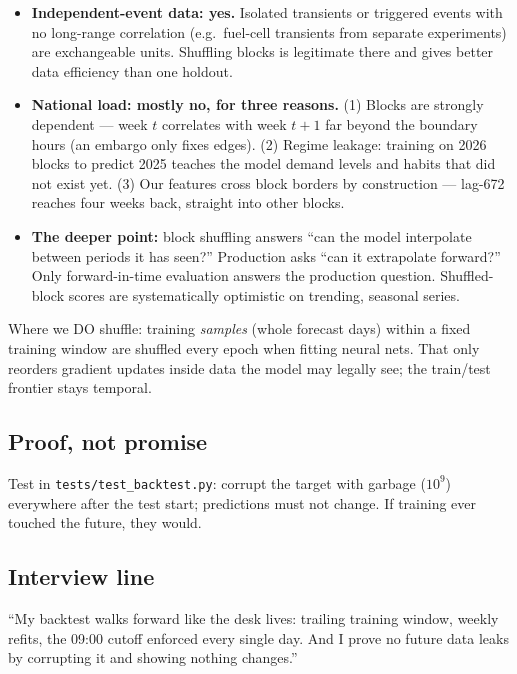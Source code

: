 \begin{itemize}
  \item \textbf{Independent-event data: yes.} Isolated transients or triggered
        events with no long-range correlation (e.g.\ fuel-cell transients from
        separate experiments) are exchangeable units. Shuffling blocks is
        legitimate there and gives better data efficiency than one holdout.
  \item \textbf{National load: mostly no, for three reasons.}
        (1) Blocks are strongly dependent --- week $t$ correlates with week
        $t{+}1$ far beyond the boundary hours (an embargo only fixes edges).
        (2) Regime leakage: training on 2026 blocks to predict 2025 teaches
        the model demand levels and habits that did not exist yet.
        (3) Our features cross block borders by construction --- lag-672
        reaches four weeks back, straight into other blocks.
  \item \textbf{The deeper point:} block shuffling answers ``can the model
        interpolate between periods it has seen?'' Production asks ``can it
        extrapolate forward?'' Only forward-in-time evaluation answers the
        production question. Shuffled-block scores are systematically
        optimistic on trending, seasonal series.
\end{itemize}

Where we DO shuffle: training \emph{samples} (whole forecast days) within a
fixed training window are shuffled every epoch when fitting neural nets.
That only reorders gradient updates inside data the model may legally see;
the train/test frontier stays temporal.

\subsection{Proof, not promise}

Test in \texttt{tests/test\_backtest.py}: corrupt the target with garbage
($10^9$) everywhere after the test start; predictions must not change.
If training ever touched the future, they would.

\subsection{Interview line}

``My backtest walks forward like the desk lives: trailing training window,
weekly refits, the 09:00 cutoff enforced every single day. And I prove no
future data leaks by corrupting it and showing nothing changes.''
